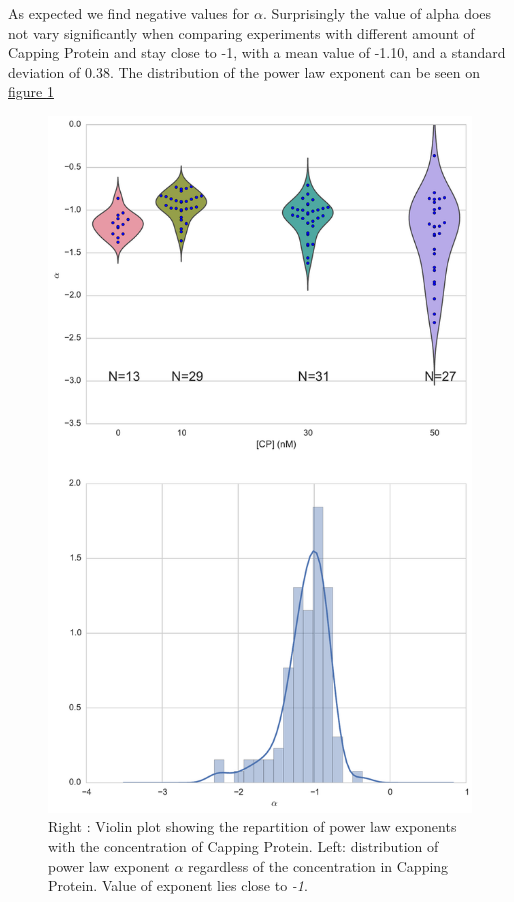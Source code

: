 \documentclass[A4paperpaper,11pt,english]{sphinxmanual}
\begin{document}
As expected we find negative values for \(\alpha\). Surprisingly the value
of alpha does not vary significantly when comparing experiments with different
amount of Capping Protein and stay close to -1, with a mean value of -1.10, and
a standard deviation of 0.38. The distribution of the power law exponent can be
seen on \hyperref[index-latex:power-law-exponent]{figure  \ref*{index-latex:power-law-exponent}}
\begin{figure}[htbp]
\centering
\capstart

\includegraphics[width=0.600\linewidth]{alpha_violin.pdf}
\caption{Right : Violin plot showing the repartition of power law exponents with the
concentration of Capping Protein. Left: distribution of power law exponent
\(\alpha\) regardless of the concentration in Capping Protein. Value of
exponent lies close to \emph{-1}.}\label{index-latex:power-law-exponent}\end{figure}
\end{document}
